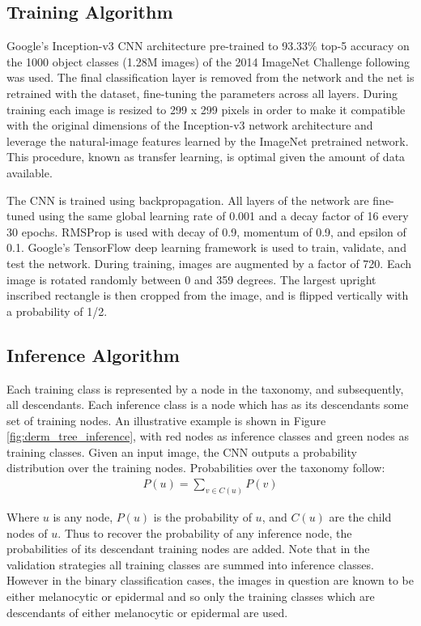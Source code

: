 \subsection{Training Algorithm}
Google’s Inception-v3 CNN architecture pre-trained to 93.33\% top-5 accuracy on the 1000 object classes (1.28M images) of the 2014 ImageNet Challenge following \cite{szegedy2016rethinking} was used. The final classification layer is removed from the network and the net is retrained with the dataset, fine-tuning the parameters across all layers. During training each image is resized to 299 x 299 pixels in order to make it compatible with the original dimensions of the Inception-v3 network architecture and leverage the natural-image features learned by the ImageNet pretrained network. This procedure, known as transfer learning, is optimal given the amount of data available.

The CNN is trained using backpropagation. All layers of the network are fine-tuned using the same global learning rate of 0.001 and a decay factor of 16 every 30 epochs. RMSProp is used with decay of 0.9, momentum of 0.9, and epsilon of 0.1. Google’s TensorFlow \cite{abadi2016tensorflow} deep learning framework is used to train, validate, and test the network. During training, images are augmented by a factor of 720. Each image is rotated randomly between 0 and 359 degrees. The largest upright inscribed rectangle is then cropped from the image, and is flipped vertically with a probability of 1/2. 

\subsection{Inference Algorithm}
Each training class is represented by a node in the taxonomy, and subsequently, all descendants. Each inference class is a node which has as its descendants some set of training nodes. An illustrative example is shown in Figure \ref{fig:derm_tree_inference}, with red nodes as inference classes and green nodes as training classes. Given an input image, the CNN outputs a probability distribution over the training nodes. Probabilities over the taxonomy follow:
\begin{gather}
    P(u) = \sum_{v \in C(u)} P(v)
\end{gather}

Where $u$ is any node, $P(u)$ is the probability of $u$, and $C(u)$ are the child nodes of $u$. Thus to recover the probability of any inference node, the probabilities of its descendant training nodes are added. Note that in the validation strategies all training classes are summed into inference classes. However in the binary classification cases, the images in question are known to be either melanocytic or epidermal and so only the training classes which are descendants of either melanocytic or epidermal are used.

